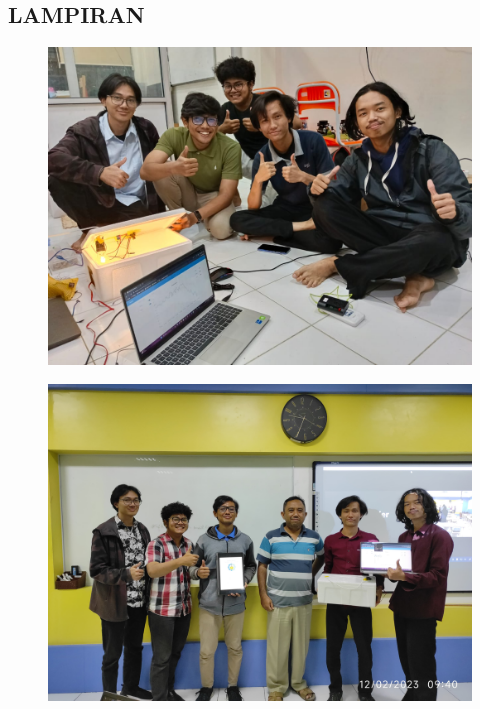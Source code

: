 \begin{center}
    \section*{LAMPIRAN}
\end{center}

\setcounter{section}{6}
\setcounter{subsection}{0}

\begin{figure}[H]
     \centering
     \includegraphics[width=13cm]{image/dokum2.jpg}
      \label{fig:Cover}
\end{figure}
\begin{figure}[H]
     \centering
     \includegraphics[width=13cm]{image/dokum3.jpg}
      \label{fig:Cover}
\end{figure}
